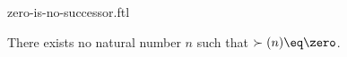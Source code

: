 \documentclass{stex}
\begin{document}
\begin{smodule}{zero-is-no-successor.ftl}


\begin{axiom}[forthel,id=ZeroIsNoSuccAx]
  There exists no natural number $n$ such that $\succ(n) \eq \zero$.
\end{axiom}

\end{smodule}
\end{document}
